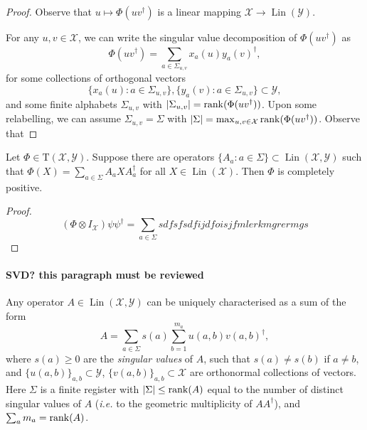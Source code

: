 \documentclass[12pt]{report}
\newcommand{\calY}{{\mathcal{Y}}}
\newcommand{\calX}{{\mathcal{X}}}
\newcommand{\rmT}{{\mathrm{T}}}
\DeclareMathOperator{\Lin}{Lin}
\begin{document}
\begin{proof}
	Observe that $u\mapsto\Phi(uv^\dagger)$ is a linear mapping $\calX\to\Lin(\calY)$.

	For any $u,v\in\calX$, we can write the singular value decomposition of $\Phi(uv^\dagger)$ as
	\begin{equation}
		\Phi(uv^\dagger) = \sum_{a\in\Sigma_{u,v}} x_a(u) y_a(v)^\dagger,
	\end{equation}
	for some collections of orthogonal vectors
	\begin{equation}
		\{x_a(u): a \in\Sigma_{u,v}\},
		\{y_a(v): a \in\Sigma_{u,v}\}\subset\calY,
	\end{equation}
	and some finite alphabets $\Sigma_{u,v}$ with $\lvert\Sigma_{u,v}\rvert=\rank(\Phi(uv^\dagger))$.
	Upon some relabelling, we can assume $\Sigma_{u,v}=\Sigma$ with $\lvert\Sigma\rvert=\max_{u,v\in\calX}\rank(\Phi(uv^\dagger))$.
	Observe that 
\end{proof}

\begin{prop}
	Let $\Phi\in\rmT(\calX,\calY)$.
	Suppose there are operators $\{A_a: a\in\Sigma\}\subset\Lin(\calX,\calY)$ such that
	$\Phi(X)=\sum_{a\in\Sigma}A_a X A_a^\dagger$ for all $X\in\Lin(\calX)$.
	Then $\Phi$ is completely positive.
\end{prop}
\begin{proof}
	\begin{equation}
		(\Phi\otimes I_{\calX}) \psi\psi^\dagger
		= \sum_{a\in\Sigma} sdfsfsdfijdfoisjfmlerkmgrermgs
	\end{equation}
\end{proof}

\paragraph{SVD? this paragraph must be reviewed}
Any operator $A\in\Lin(\calX,\calY)$ can be uniquely characterised as a sum of the form
\begin{equation}
	A = \sum_{a\in\Sigma} s(a)
	\sum_{b=1}^{m_a} u(a,b) v(a,b)^\dagger,
\end{equation}
where $s(a)\ge0$ are the \emph{singular values} of $A$, such that $s(a)\neq s(b)$ if $a\neq b$, and $\{u(a,b)\}_{a,b}\subset\calY$,
$\{v(a,b)\}_{a,b}\subset\calX$ are orthonormal collections of vectors.
Here $\Sigma$ is a finite register with $\lvert\Sigma\rvert\le \rank(A)$ equal to the number of distinct singular values of $A$ (\emph{i.e.} to the geometric multiplicity of $AA^\dagger$), and $\sum_a m_a=\rank(A)$.
\end{document}
